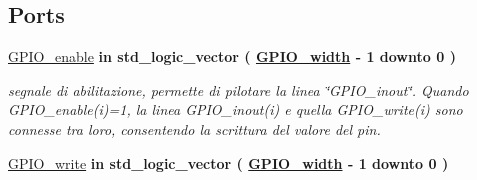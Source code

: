 \subsection*{Ports}
 \begin{DoxyCompactItemize}
\item 
\hypertarget{group___g_p_i_o-array_ga11dd30ea6a502615af8dccf7a8bc78fe}{\hyperlink{group___g_p_i_o-array_ga11dd30ea6a502615af8dccf7a8bc78fe}{G\+P\+I\+O\+\_\+enable}  {\bfseries {\bfseries \textcolor{vhdlchar}{in}\textcolor{vhdlchar}{ }}} {\bfseries \textcolor{vhdlchar}{std\+\_\+logic\+\_\+vector}\textcolor{vhdlchar}{ }\textcolor{vhdlchar}{(}\textcolor{vhdlchar}{ }\textcolor{vhdlchar}{ }\textcolor{vhdlchar}{ }\textcolor{vhdlchar}{ }{\bfseries \hyperlink{group___g_p_i_o-array_ga0b52ca75e9a6093b2b60d5e851803069}{G\+P\+I\+O\+\_\+width}} \textcolor{vhdlchar}{-\/}\textcolor{vhdlchar}{ } \textcolor{vhdldigit}{1} \textcolor{vhdlchar}{ }\textcolor{vhdlchar}{downto}\textcolor{vhdlchar}{ }\textcolor{vhdlchar}{ } \textcolor{vhdldigit}{0} \textcolor{vhdlchar}{ }\textcolor{vhdlchar}{)}\textcolor{vhdlchar}{ }} }\label{group___g_p_i_o-array_ga11dd30ea6a502615af8dccf7a8bc78fe}

\begin{DoxyCompactList}\small\item\em segnale di abilitazione, permette di pilotare la linea \char`\"{}\+G\+P\+I\+O\+\_\+inout\char`\"{}. Quando G\+P\+I\+O\+\_\+enable(i)=1, la linea G\+P\+I\+O\+\_\+inout(i) e quella G\+P\+I\+O\+\_\+write(i) sono connesse tra loro, consentendo la scrittura del valore del pin. \end{DoxyCompactList}\item 
\hypertarget{group___g_p_i_o-array_ga15a2a96cc1645c826c8ac6469f70c5c0}{\hyperlink{group___g_p_i_o-array_ga15a2a96cc1645c826c8ac6469f70c5c0}{G\+P\+I\+O\+\_\+write}  {\bfseries {\bfseries \textcolor{vhdlchar}{in}\textcolor{vhdlchar}{ }}} {\bfseries \textcolor{vhdlchar}{std\+\_\+logic\+\_\+vector}\textcolor{vhdlchar}{ }\textcolor{vhdlchar}{(}\textcolor{vhdlchar}{ }\textcolor{vhdlchar}{ }\textcolor{vhdlchar}{ }\textcolor{vhdlchar}{ }{\bfseries \hyperlink{group___g_p_i_o-array_ga0b52ca75e9a6093b2b60d5e851803069}{G\+P\+I\+O\+\_\+width}} \textcolor{vhdlchar}{-\/}\textcolor{vhdlchar}{ } \textcolor{vhdldigit}{1} \textcolor{vhdlchar}{ }\textcolor{vhdlchar}{downto}\textcolor{vhdlchar}{ }\textcolor{vhdlchar}{ } \textcolor{vhdldigit}{0} \textcolor{vhdlchar}{ }\textcolor{vhdlchar}{)}\textcolor{vhdlchar}{ }} }\label{group___g_p_i_o-array_ga15a2a96cc1645c826c8ac6469f70c5c0}


\end{DoxyCompactItemize}
